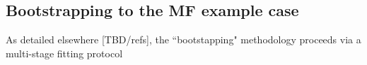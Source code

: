 \subsection{Bootstrapping to the MF example case}

As detailed elsewhere [TBD/refs], the ``bootstapping" methodology proceeds via a multi-stage fitting protocol
